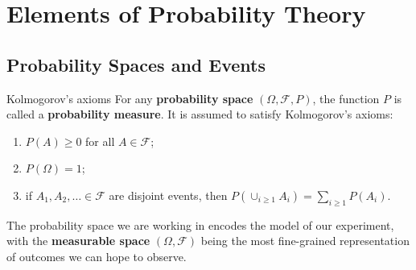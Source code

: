 \chapter{Elements of Probability Theory}


\section{Probability Spaces and Events}
\begin{defn}{Kolmogorov's axioms}{}
For any \textbf{probability space} \( (\Omega, \mathcal{F}, P ) \), the function \( P \) is called a \textbf{probability measure}. It is assumed to satisfy Kolmogorov's axioms:

\begin{enumerate}[label = \emph{\roman*.)}]
    \item \( P(A) \geq 0 \) for all \( A \in \mathcal{F}  \);
    \item \( P(\Omega )  = 1\);
    \item if \( A_1, A_2, \dots \in \mathcal{F}  \)  are disjoint events, then \( P(\cup _{i\geq 1}A_{i} ) = \sum_{i\geq 1}P(A_{i} )  \). 
\end{enumerate}
\end{defn}

The probability space we are working in encodes the model of our experiment, with the \textbf{measurable space} \( (\Omega , \mathcal{F} ) \) being the most fine-grained representation of outcomes we can hope to observe. 

